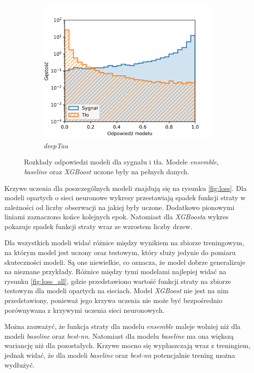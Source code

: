 \documentclass{pracalicmgr}
\begin{document}
\begin{figure}[H]
\begin{subfigure}{.5\textwidth}
	\includegraphics[width=1\textwidth]{density_deepTau.png}
	\caption{\textit{deepTau}}
	\end{subfigure}
	\caption{Rozkłady odpowiedzi modeli dla sygnału i tła. Modele \textit{ensemble}, \textit{baseline} oraz \textit{XGBoost} uczone były na pełnych danych.}
	\label{fig:dist}
	\end{figure}
	\newpage
	Krzywe uczenia dla poszczególnych modeli znajdują się na rysunku \ref{fig:loss}. Dla modeli opartych o sieci neuronowe wykresy przestawiają spadek funkcji straty w zależności od liczby obserwacji na jakiej były uczone. Dodatkowo pionowymi liniami zaznaczono końce kolejnych epok. Natomiast dla \textit{XGBoosta} wykres pokazuje spadek funkcji straty wraz ze wzrostem liczby drzew.
	
	Dla wszystkich modeli widać różnice między wynikiem na zbiorze treningowym, na którym model jest uczony oraz testowym, który służy jedynie do pomiaru skuteczności modeli. Są one niewielkie, co oznacza, że model dobrze generalizuje na nieznane przykłady. Różnice między tymi modelami najlepiej widać na rysunku \ref{fig:loss_all}, gdzie przedstawiono wartość funkcji straty na zbiorze testowym dla modeli opartych na sieciach. Model \textit{XGBoost} nie jest na nim przedstawiony, ponieważ jego krzywa uczenia nie może być bezpośrednio porównywana z krzywymi uczenia sieci neuronowych. 
	
	Można zauważyć, że funkcja straty dla modelu \textit{ensemble} maleje wolniej niż dla modeli \textit{baseline} oraz \textit{best-nn}. Natomiast dla modelu \textit{baseline} ma ona większą wariancję niż dla pozostałych. Krzywe mocno się wypłaszczają wraz z treningiem, jednak widać, że dla modeli \textit{baseline} oraz \textit{best-nn} potencjalnie trening można wydłużyć.
	
\end{document}
